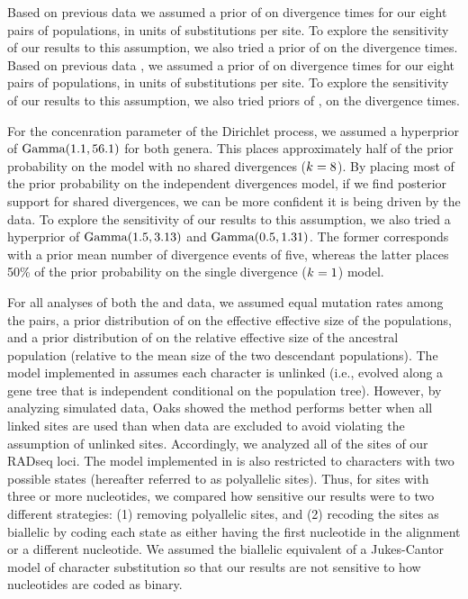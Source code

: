 Based on previous data \citep{Welton2010, Welton2010zootaxa, Siler2010} we
assumed a prior of  on divergence times for our eight pairs
of  populations, in units of substitutions per site.
To explore the sensitivity of our results to this assumption, we also
tried a prior of  on the divergence times.
Based on previous data \citep{Siler2012, Siler2014kikuchii}, we assumed a prior
of  on divergence times for our eight pairs of 
populations, in units of substitutions per site.
To explore the sensitivity of our results to this assumption, we also tried
priors of ,  on the 
divergence times.

For the concenration parameter of the Dirichlet process, we assumed
a hyperprior of $\textrm{Gamma}(1.1, 56.1)$ for both genera.
This places approximately half of the prior probability on the model
with no shared divergences ($k_{} = 8$).
By placing most of the prior probability on the independent divergences model,
if we find posterior support for shared divergences, we can be more confident
it is being driven by the data.
To explore the sensitivity of our results to this assumption, we also
tried a hyperprior of
$\textrm{Gamma}(1.5, 3.13)$
and
$\textrm{Gamma}(0.5, 1.31)$.
The former corresponds with a prior mean number of divergence events of five,
whereas the latter places 50\% of the prior probability on the single
divergence ($k_{} = 1$) model.

For all analyses of both the  and  data, we
assumed equal mutation rates among the pairs, a prior distribution of
 on the effective effective size of the populations, and a
prior distribution of  on the relative effective size of the
ancestral population (relative to the mean size of the two descendant
populations).
The model implemented in \ecoevolity assumes each character is unlinked (i.e.,
evolved along a gene tree that is independent conditional on the population
tree).
However, by analyzing simulated data, Oaks \citeyear{Oaks2018ecoevolity} showed
the method performs better when all linked sites are used than when data are
excluded to avoid violating the assumption of unlinked sites.
Accordingly, we analyzed all of the sites of our RADseq loci.
The model implemented in \ecoevolity is also restricted to characters with two
possible states (hereafter referred to as polyallelic sites).
Thus, for sites with three or more nucleotides, we compared how sensitive our
results were to two different strategies:
(1) removing polyallelic sites, and
(2) recoding the sites as biallelic by coding each state as either having the
first nucleotide in the alignment or a different nucleotide.
We assumed the biallelic equivalent of a Jukes-Cantor model of character
substitution \citep{JC1969} so that our results are not sensitive to how
nucleotides are coded as binary.

